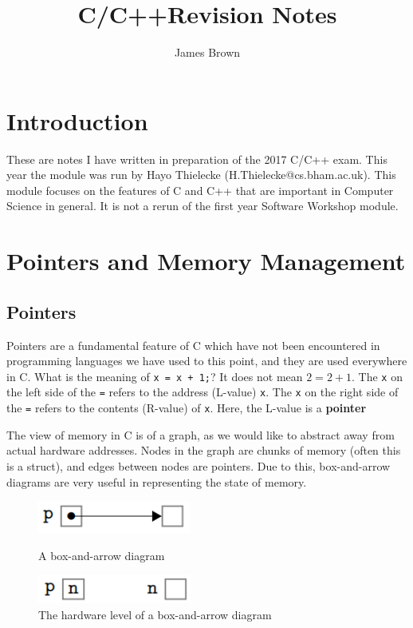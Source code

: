 \documentclass{article}
\title{C/C++\linebreak Revision Notes}
\author{James Brown}
\begin{document}
	\maketitle
	\newpage
	\tableofcontents
	\newpage

	\section{Introduction}
	These are notes I have written in preparation of the 2017 C/C++ exam. This year the module was run by Hayo Thielecke (H.Thielecke@cs.bham.ac.uk). This module focuses on the features of C and C++ that are important in Computer Science in general. It is not a rerun of the first year Software Workshop module.
	\linebreak \linebreak
	
	\section{Pointers and Memory Management}
	\subsection{Pointers}	
	Pointers are a fundamental feature of C which have not been encountered in programming languages we have used to this point, and they are used everywhere in C. What is the meaning of \texttt{x = x + 1;}? It does not mean $2 = 2 + 1$. The \texttt{x} on the left side of the \texttt{=} refers to the address (L-value) \texttt{x}. The \texttt{x} on the right side of the \texttt{=} refers to the contents (R-value) of \texttt{x}. Here, the L-value is a \textbf{pointer}
	
	\par 
	The view of memory in C is of a graph, as we would like to abstract away from actual hardware addresses. Nodes in the graph are chunks of memory (often this is a struct), and edges between nodes are pointers. Due to this, box-and-arrow diagrams are very useful in representing the state of memory.
	
	\begin{figure}[ht]
		\begin{minipage}[t]{0.45\textwidth}
			\centering
			\includegraphics[width=0.45\textwidth]{box_arrow_diagram}
			\caption{A box-and-arrow diagram}
			\label{fig:bow arrow diagram}
		\end{minipage}
		\hfill
		\begin{minipage}[t]{0.45\textwidth}
			\centering
			\includegraphics[width=0.45\textwidth]{box_arrow_diagram_memory}
			\caption{The hardware level of a box-and-arrow diagram}
			\label{fig:box arrow diagram memory}
		\end{minipage}
	\end{figure}	
		
\end{document}
